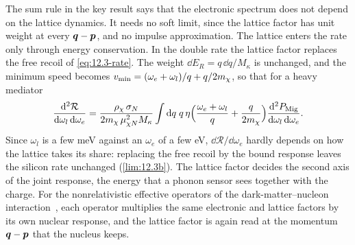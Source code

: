 The sum rule in the key result says that the electronic spectrum does not depend on the lattice dynamics. It needs no soft limit, since the lattice factor has unit weight at every $\bm{q} - \bm{p}$, and no impulse approximation. The lattice enters the rate only through energy conservation. In the double rate the lattice factor replaces the free recoil of \cref{eq:12.3-rate}. The weight $\dd E_R = q\,\dd q/M_\kappa$ is unchanged, and the minimum speed becomes $v_{\mathrm{min}} = (\omega_e + \omega_l)/q + q/2m_{\chi}$, so that for a heavy mediator
\begin{equation}
  \frac{\mathrm{d}^2\mathcal{R}}{\mathrm{d}\omega_l\,\mathrm{d}\omega_e} = \frac{\rho_\chi\,\sigma_N}{2m_{\chi}\,\mu_{\chi N}^2M_\kappa}\int\mathrm{d} q\;q\,\eta\Bigl(\frac{\omega_e + \omega_l}{q} + \frac{q}{2m_{\chi}}\Bigr)\frac{\mathrm{d}^2P_{\mathrm{Mig}}}{\mathrm{d}\omega_l\,\mathrm{d}\omega_e} .
  \label{eq:12.4-rate}
\end{equation}
Since $\omega_l$ is a few meV against an $\omega_e$ of a few eV, $\dd\mathcal{R}/\dd\omega_e$ hardly depends on how the lattice takes its share: replacing the free recoil by the bound response leaves the silicon rate unchanged (\cref{lim:12.3b}). The lattice factor decides the second axis of the joint response, the energy that a phonon sensor sees together with the charge. For the nonrelativistic effective operators of the dark-matter--nucleon interaction~\cite{berghaus2026migdal}, each operator multiplies the same electronic and lattice factors by its own nuclear response, and the lattice factor is again read at the momentum $\bm{q} - \bm{p}$ that the nucleus keeps.

